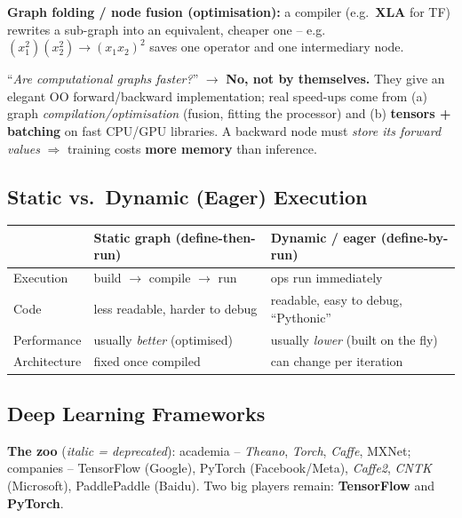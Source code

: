 \documentclass[10pt,a4paper]{article}
\begin{document}
	\textbf{Graph folding / node fusion (optimisation):} a compiler (e.g.\ \textbf{XLA} for TF) rewrites a sub-graph into an equivalent, cheaper one -- e.g.\ $(x_1^2)(x_2^2) \to (x_1 x_2)^2$ saves one operator and one intermediary node.

	\begin{examtipbox}
		``\emph{Are computational graphs faster?}'' $\to$ \textbf{No, not by themselves.} They give an elegant OO forward/backward implementation; real speed-ups come from (a) graph \emph{compilation/optimisation} (fusion, fitting the processor) and (b) \textbf{tensors + batching} on fast CPU/GPU libraries. A backward node must \emph{store its forward values} $\Rightarrow$ training costs \textbf{more memory} than inference.
	\end{examtipbox}

	\subsection{Static vs.\ Dynamic (Eager) Execution}

	\begin{center}
	\begin{tabular}{@{}p{4cm} p{5.4cm} p{5.4cm}@{}}
		\toprule
		& \textbf{Static graph} (define-then-run) & \textbf{Dynamic / eager} (define-by-run) \\
		\midrule
		Execution & build $\to$ compile $\to$ run & ops run immediately \\
		Code      & less readable, harder to debug & readable, easy to debug, ``Pythonic'' \\
		Performance & usually \emph{better} (optimised) & usually \emph{lower} (built on the fly) \\
		Architecture & fixed once compiled & can change per iteration \\
		\bottomrule
	\end{tabular}
	\end{center}

	\subsection{Deep Learning Frameworks}

	\textbf{The zoo} (\emph{italic = deprecated}): academia -- \emph{Theano}, \emph{Torch}, \emph{Caffe}, MXNet; companies -- TensorFlow (Google), PyTorch (Facebook/Meta), \emph{Caffe2}, \emph{CNTK} (Microsoft), PaddlePaddle (Baidu). Two big players remain: \textbf{TensorFlow} and \textbf{PyTorch}.
\end{document}
